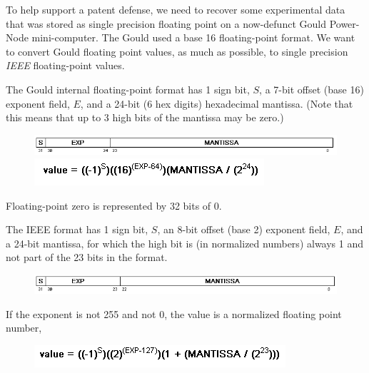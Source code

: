 
To help support a patent defense, we need to recover some experimental
data that was stored as single precision floating point on a now-defunct
Gould Power-Node mini-computer.  The Gould used a base 16 floating-point
format. We want to convert Gould floating point values, as much as
possible, to single precision \emph{IEEE} floating-point values.

The Gould internal floating-point format has 1 sign bit, $S$, a 7-bit offset
(base 16) exponent field, $E$, and a 24-bit (6 hex digits) hexadecimal
mantissa.  (Note that this means that up to 3 high bits of the mantissa
may be zero.)


\begin{figure}[!h]
    \begin{center}
        \includegraphics[]{c1.png} \\
        \includegraphics[]{c2.png} \\ 
    \end{center}
\end{figure}

Floating-point zero is represented by 32 bits of 0.

The IEEE format has 1 sign bit, $S$, an 8-bit offset (base 2) exponent
field, $E$, and a 24-bit mantissa, for which the high bit is (in normalized
numbers) always 1 and not part of the 23 bits in the format.

\begin{figure}[!h]
    \begin{center}
        \includegraphics[]{c3.png} \\
    \end{center}
\end{figure}

If the exponent is not 255 and not 0, the value is a normalized floating point number,

\begin{figure}[!h]
    \begin{center}
        \includegraphics[]{c4.png} \\
    \end{center}
\end{figure}

